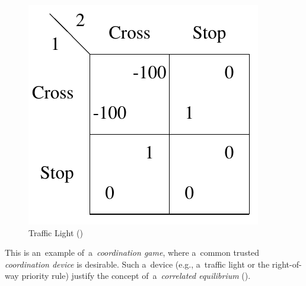\begin{description}
    \begin{figure}[H]
      \centering
      \includegraphics[width=.23\paperwidth]{../img/traffic-light.png}
      \caption[Traffic Light]{Traffic Light (\cite{AGT07})}
      \label{fig:traffic-light}
    \end{figure}

    This is an~example of~a~\emph{coordination game}, where a~common trusted \emph{coordination device} is desirable.
    Such a~device (e.g., a~traffic light or the right-of-way priority rule) justify the concept of~a~\emph{correlated equilibrium} (\cite[Subsection~1.3.6]{AGT07}).


\end{description}
